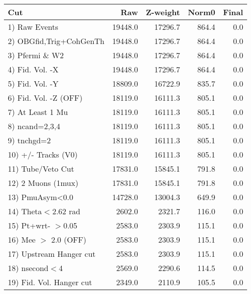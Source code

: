  \begin{table}[h!]\centering
 \begin{tabular}{||l||r|r|r|r||}
 \hline
 \hline
 Cut & Raw & Z-weight & Norm0 & Final \\
 \hline
  1) Raw Events           &     19448.0 &     17296.7 &       864.4 &         0.0 \\
  2) OBGfid,Trig+CohGenTh &     19448.0 &     17296.7 &       864.4 &         0.0 \\
  3) Pfermi \& W2         &     19448.0 &     17296.7 &       864.4 &         0.0 \\
  4) Fid. Vol. -X         &     19448.0 &     17296.7 &       864.4 &         0.0 \\
  5) Fid. Vol. -Y         &     18809.0 &     16722.9 &       835.7 &         0.0 \\
  6) Fid. Vol. -Z (OFF)   &     18119.0 &     16111.3 &       805.1 &         0.0 \\
  7) At Least 1 Mu        &     18119.0 &     16111.3 &       805.1 &         0.0 \\
  8) ncand=2,3,4          &     18119.0 &     16111.3 &       805.1 &         0.0 \\
  9) tnchgd=2             &     18119.0 &     16111.3 &       805.1 &         0.0 \\
 10) +/- Tracks (V0)      &     18119.0 &     16111.3 &       805.1 &         0.0 \\
 11) Tube/Veto Cut        &     17831.0 &     15845.1 &       791.8 &         0.0 \\
 12) 2 Muons (1mux)       &     17831.0 &     15845.1 &       791.8 &         0.0 \\
 13) PmuAsym<0.0          &     14728.0 &     13004.3 &       649.9 &         0.0 \\
 14) Theta$<$2.62 rad     &      2602.0 &      2321.7 &       116.0 &         0.0 \\
 15) Pt+wrt- $>$0.05      &      2583.0 &      2303.9 &       115.1 &         0.0 \\
 16) Mee $>$ 2.0  (OFF)   &      2583.0 &      2303.9 &       115.1 &         0.0 \\
 17) Upstream Hanger cut  &      2583.0 &      2303.9 &       115.1 &         0.0 \\
 18) nsecond$<$4          &      2569.0 &      2290.6 &       114.5 &         0.0 \\
 19) Fid. Vol. Hanger cut &      2349.0 &      2110.9 &       105.5 &         0.0 \\

\end{tabular}
\end{table}
